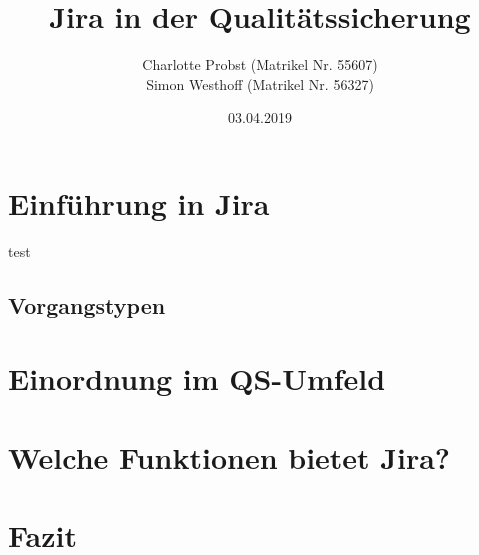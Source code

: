 \documentclass[a4paper, 10pt]{scrartcl}
\title{Jira in der Qualitätssicherung}
\author{Charlotte Probst (Matrikel Nr. 55607)\\
 Simon Westhoff (Matrikel Nr. 56327)}
\date{03.04.2019}
\begin{document}
\maketitle


\newpage

\tableofcontents

\newpage

\section{Einführung in Jira}
test
\subsection{Vorgangstypen}

\section{Einordnung im QS-Umfeld}

\section{Welche Funktionen bietet Jira?}

\section{Fazit}
\end{document}

